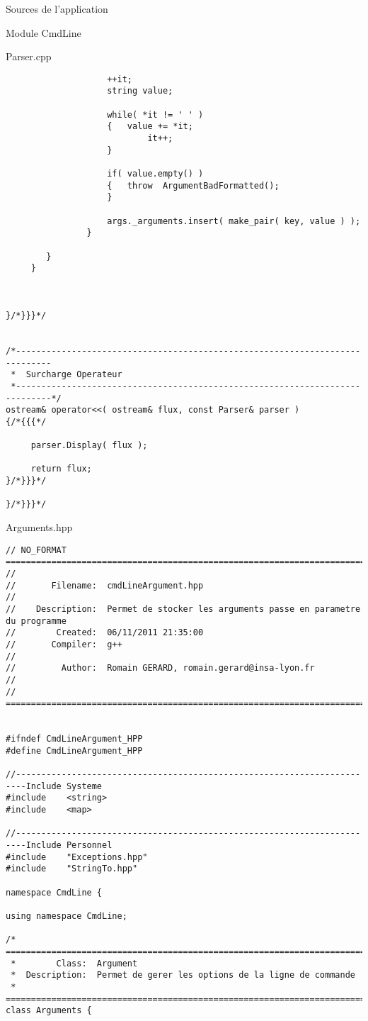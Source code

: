 \documentclass{article}
\begin{document}
\begin{section}{Sources de l'application}
\begin{subsection}{Module CmdLine}
\begin{paragraph}{Parser.cpp}
\begin{verbatim}
                	++it;
                	string value;
	
                	while( *it != ' ' ) 
                	{	value += *it;
                	        it++;
                	}
	
                	if( value.empty() ) 
                	{	throw  ArgumentBadFormatted();
                	}
	
                	args._arguments.insert( make_pair( key, value ) );
     	    	}

     	}
     }



}/*}}}*/


/*-----------------------------------------------------------------------------
 *  Surcharge Operateur
 *-----------------------------------------------------------------------------*/
ostream& operator<<( ostream& flux, const Parser& parser )
{/*{{{*/

     parser.Display( flux );

     return flux;
}/*}}}*/

}/*}}}*/
      \end{verbatim}
      \end{paragraph}

  \newpage
  \begin{paragraph}{Arguments.hpp}
   \begin{verbatim}
// NO_FORMAT ============================================================================
//
//       Filename:  cmdLineArgument.hpp
//
//    Description:  Permet de stocker les arguments passe en parametre du programme
//        Created:  06/11/2011 21:35:00
//       Compiler:  g++
//
//         Author:  Romain GERARD, romain.gerard@insa-lyon.fr
//
// =====================================================================================


#ifndef CmdLineArgument_HPP
#define CmdLineArgument_HPP

//------------------------------------------------------------------------Include Systeme
#include    <string>
#include    <map>

//------------------------------------------------------------------------Include Personnel
#include    "Exceptions.hpp"
#include    "StringTo.hpp"

namespace CmdLine {

using namespace CmdLine;

/* =====================================================================================
 *        Class:  Argument
 *  Description:  Permet de gerer les options de la ligne de commande
 * =====================================================================================*/
class Arguments {


\end{verbatim}
\end{paragraph}
\end{subsection}
\end{section}
\end{document}
